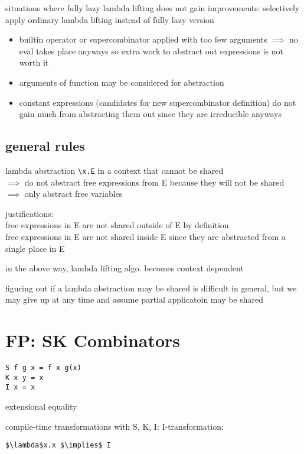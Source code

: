 \documentclass[8pt]{extarticle}
\begin{document}
\begin{multicols*}{2}
\begin{tblr}[]{}
situations where fully lazy lambda lifting does not gain improvements: selectively apply ordinary lambda lifting instead of fully lazy version
\begin{itemize}
\item builtin operator or supercombinator applied with too few arguments $\implies$ no eval takes place anyways so extra work to abstract out expressions is not worth it
\item arguments of function may be considered for abstraction
\item constant expressions (candidates for new supercombinator definition) do not gain much from abstracting them out since they are irreducible anyways
\end{itemize}

\subsection{general rules}
lambda abstraction \verb|\x.E| in a context that cannot be shared\\
$\implies$ do not abstract free expressions from E because they will not be shared\\
$\implies$ only abstract free variables

justifications:\\
free expressions in E are not shared outside of E by definition\\
free expressions in E are not shared inside E since they are abstracted from a single place in E

in the above way, lambda lifting algo. becomes context dependent

figuring out if a lambda abstraction may be shared is difficult in general, but we may give up at any time and assume partial applicatoin may be shared

\section{FP: SK Combinators}

\begin{lstlisting}
S f g x = f x g(x)
K x y = x
I x = x
\end{lstlisting}

extensional equality

compile-time transformations with S, K, I:
I-transformation:
\begin{lstlisting}
$\lambda$x.x $\implies$ I
\end{lstlisting}


\end{tblr}
\end{multicols*}
\end{document}
